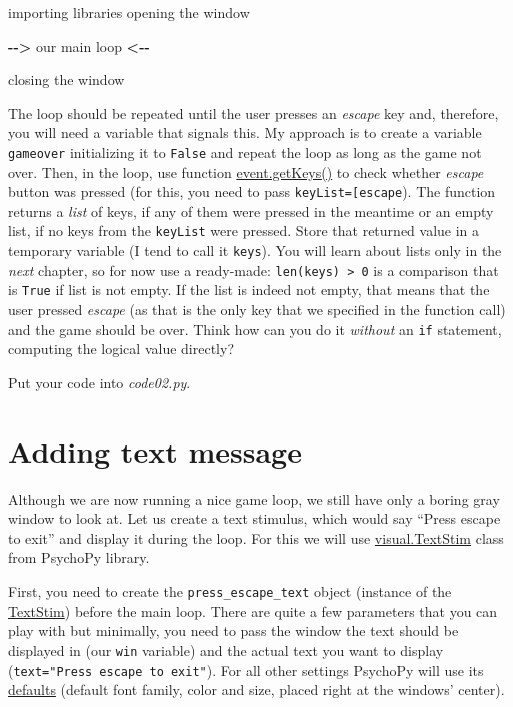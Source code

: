 \documentclass[
]{book}
\newenvironment{Shaded}{\begin{snugshade}}{\end{snugshade}}
\newcommand{\NormalTok}[1]{#1}
\newcommand{\OperatorTok}[1]{\textcolor[rgb]{0.81,0.36,0.00}{\textbf{#1}}}
\begin{document}
\begin{Shaded}
\begin{Highlighting}[]
\NormalTok{importing libraries}
\NormalTok{opening the window}

\OperatorTok{{-}{-}\textgreater{}}\NormalTok{ our main loop }\OperatorTok{\textless{}{-}{-}}

\NormalTok{closing the window}
\end{Highlighting}
\end{Shaded}

The loop should be repeated until the user presses an \emph{escape} key and, therefore, you will need a variable that signals this. My approach is to create a variable \texttt{gameover} initializing it to \texttt{False} and repeat the loop as long as the game not over. Then, in the loop, use function \href{https://psychopy.org/api/event.html\#psychopy.event.getKeys}{event.getKeys()} to check whether \emph{escape} button was pressed (for this, you need to pass \texttt{keyList={[}\textquotesingle{}escape\textquotesingle{}{]}}). The function returns a \emph{list} of keys, if any of them were pressed in the meantime or an empty list, if no keys from the \texttt{keyList} were pressed. Store that returned value in a temporary variable (I tend to call it \texttt{keys}). You will learn about lists only in the \emph{next} chapter, so for now use a ready-made: \texttt{len(keys)\ \textgreater{}\ 0} is a comparison that is \texttt{True} if list is not empty. If the list is indeed not empty, that means that the user pressed \emph{escape} (as that is the only key that we specified in the function call) and the game should be over. Think how can you do it \emph{without} an \texttt{if} statement, computing the logical value directly?

Put your code into \emph{code02.py}.

\hypertarget{adding-text-message}{%
\section{Adding text message}\label{adding-text-message}}

Although we are now running a nice game loop, we still have only a boring gray window to look at. Let us create a text stimulus, which would say ``Press escape to exit'' and display it during the loop. For this we will use \href{https://psychopy.org/api/visual/textstim.html}{visual.TextStim} class from PsychoPy library.

First, you need to create the \texttt{press\_escape\_text} object (instance of the \href{https://psychopy.org/api/visual/textstim.html\%20class}{TextStim}) before the main loop. There are quite a few parameters that you can play with but minimally, you need to pass the window the text should be displayed in (our \texttt{win} variable) and the actual text you want to display (\texttt{text="Press\ escape\ to\ exit"}). For all other settings PsychoPy will use its \protect\hyperlink{arguments-by-position-or-name}{defaults} (default font family, color and size, placed right at the windows' center).
\end{document}
